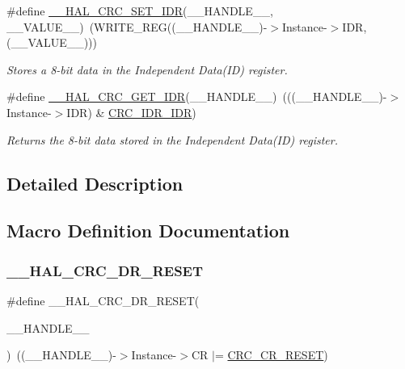 \begin{DoxyCompactItemize}
\#define \hyperlink{group___c_r_c___exported___macros_ga1d890aa6f337f97fb9a3e8537f1bbc72}{\+\_\+\+\_\+\+H\+A\+L\+\_\+\+C\+R\+C\+\_\+\+S\+E\+T\+\_\+\+I\+DR}(\+\_\+\+\_\+\+H\+A\+N\+D\+L\+E\+\_\+\+\_\+,  \+\_\+\+\_\+\+V\+A\+L\+U\+E\+\_\+\+\_\+)~(W\+R\+I\+T\+E\+\_\+\+R\+EG((\+\_\+\+\_\+\+H\+A\+N\+D\+L\+E\+\_\+\+\_\+)-\/$>$Instance-\/$>$I\+DR, (\+\_\+\+\_\+\+V\+A\+L\+U\+E\+\_\+\+\_\+)))
\begin{DoxyCompactList}\small\item\em Stores a 8-\/bit data in the Independent Data(\+I\+D) register. \end{DoxyCompactList}\item 
\#define \hyperlink{group___c_r_c___exported___macros_ga028e074ed7a9505ea0ac48a16489c5d0}{\+\_\+\+\_\+\+H\+A\+L\+\_\+\+C\+R\+C\+\_\+\+G\+E\+T\+\_\+\+I\+DR}(\+\_\+\+\_\+\+H\+A\+N\+D\+L\+E\+\_\+\+\_\+)~(((\+\_\+\+\_\+\+H\+A\+N\+D\+L\+E\+\_\+\+\_\+)-\/$>$Instance-\/$>$I\+DR) \& \hyperlink{group___peripheral___registers___bits___definition_gae9a0feb3cf1d8c5871e663ca4a174cc0}{C\+R\+C\+\_\+\+I\+D\+R\+\_\+\+I\+DR})
\begin{DoxyCompactList}\small\item\em Returns the 8-\/bit data stored in the Independent Data(\+I\+D) register. \end{DoxyCompactList}\end{DoxyCompactItemize}


\subsection{Detailed Description}


\subsection{Macro Definition Documentation}
\mbox{\label{group___c_r_c___exported___macros_ga0007a05fb01806007181e12eedc14d28}} 
\subsubsection{\texorpdfstring{\+\_\+\+\_\+\+H\+A\+L\+\_\+\+C\+R\+C\+\_\+\+D\+R\+\_\+\+R\+E\+S\+ET}{\_\_HAL\_CRC\_DR\_RESET}}
{\footnotesize\ttfamily \#define \+\_\+\+\_\+\+H\+A\+L\+\_\+\+C\+R\+C\+\_\+\+D\+R\+\_\+\+R\+E\+S\+ET(\begin{DoxyParamCaption}\item[{}]{\+\_\+\+\_\+\+H\+A\+N\+D\+L\+E\+\_\+\+\_\+ }\end{DoxyParamCaption})~((\+\_\+\+\_\+\+H\+A\+N\+D\+L\+E\+\_\+\+\_\+)-\/$>$Instance-\/$>$CR $\vert$= \hyperlink{group___peripheral___registers___bits___definition_ga7d57481fb891a0964b40f721354c56d7}{C\+R\+C\+\_\+\+C\+R\+\_\+\+R\+E\+S\+ET})}



